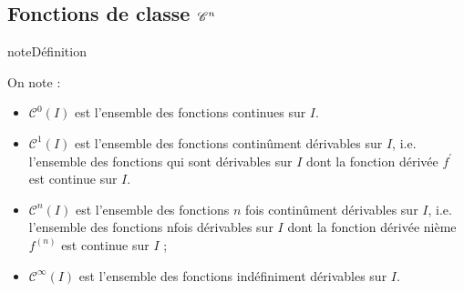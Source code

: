 \documentclass[letterpaper,10pt,french]{jupyterBook}
\begin{document}
\subsection{Fonctions de classe \protect\(\mathscr{C}^n\protect\)}
\label{\detokenize{complements:fonctions-de-classe-mathscr-c-n}}
\begin{sphinxadmonition}{note}{Définition}

\sphinxAtStartPar
On note :
\begin{itemize}
\item {} 
\sphinxAtStartPar
\(\mathscr{C}^0(I)\) est l’ensemble des fonctions continues sur \(I\).

\item {} 
\sphinxAtStartPar
\(\mathscr{C}^1(I)\) est l’ensemble des fonctions continûment dérivables sur \(I\), i.e. l’ensemble des fonctions qui sont dérivables sur \(I\) dont la fonction dérivée \(f^{'}\) est continue sur \(I\).

\item {} 
\sphinxAtStartPar
\(\mathscr{C}^n(I)\) est l’ensemble des fonctions \(n\) fois continûment dérivables sur \(I\), i.e. l’ensemble des fonctions n\sphinxhyphen{}fois dérivables sur \(I\) dont la fonction dérivée n\sphinxhyphen{}ième \(f^{(n)}\) est continue sur \(I\) ;

\item {} 
\sphinxAtStartPar
\(\mathscr{C}^\infty(I)\) est l’ensemble des fonctions indéfiniment dérivables sur \(I\).

\end{itemize}
\end{sphinxadmonition}
\end{document}
